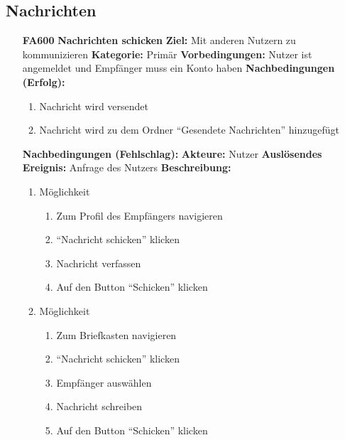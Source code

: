 \documentclass[parskip=full]{scrartcl}
\begin{document}
		\subsection{Nachrichten} \label{sec:FANachrichten}
		\begin{itemize}[nosep]
			\item[\textbf{FA600}]\textbf{Nachrichten schicken}
				\newline \textbf{Ziel:} Mit anderen Nutzern zu kommunizieren
				\newline \textbf{Kategorie:} Primär
				\newline \textbf{Vorbedingungen:} Nutzer ist angemeldet und Empfänger muss ein Konto haben
				\newline \textbf{Nachbedingungen (Erfolg):} 
				\begin{enumerate}[nosep]
					\item Nachricht wird versendet
					\item Nachricht wird zu dem Ordner “Gesendete Nachrichten” hinzugefügt
				\end{enumerate}
				\textbf{Nachbedingungen (Fehlschlag):}
				\newline \textbf{Akteure:} Nutzer
				\newline \textbf{Auslösendes Ereignis:} Anfrage des Nutzers
				\newline \textbf{Beschreibung:}
				\begin{enumerate}[nosep]
					\item Möglichkeit
						\begin{enumerate}[nosep]
							\item Zum Profil des Empfängers navigieren
							\item “Nachricht schicken” klicken
							\item Nachricht verfassen
							\item Auf den Button “Schicken” klicken
						\end{enumerate}
					\item Möglichkeit
						\begin{enumerate}[nosep]
							\item Zum Briefkasten navigieren
							\item “Nachricht schicken” klicken
							\item Empfänger auswählen
							\item Nachricht schreiben
							\item Auf den Button “Schicken” klicken\\
						\end{enumerate}
				\end{enumerate}
										

\end{itemize}
\end{document}
